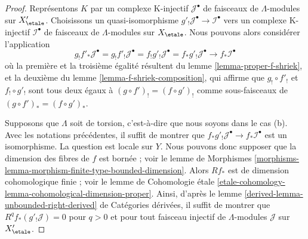 \begin{proof}
Représentons $K$ par un complexe K-injectif $\mathcal{J}^\bullet$ de
faisceaux de $\Lambda$-modules sur $X'_\etale$. Choisissons un quasi-isomorphisme
$g'_!\mathcal{J}^\bullet \to \mathcal{I}^\bullet$ vers un
complexe K-injectif $\mathcal{I}^\bullet$ de
faisceaux de $\Lambda$-modules sur $X_\etale$.
Nous pouvons alors considérer l'application
$$
g_!f'_*\mathcal{J}^\bullet =
g_!f'_!\mathcal{J}^\bullet =
f_!g'_!\mathcal{J}^\bullet =
f_*g'_!\mathcal{J}^\bullet \to
f_*\mathcal{I}^\bullet
$$
où la première et la troisième égalité résultent du
lemme \ref{lemma-proper-f-shriek},
et la deuxième du
lemme \ref{lemma-f-shriek-composition}, qui affirme que
$g_! \circ f'_!$ et $f_! \circ g'_!$ sont tous deux égaux à
$(g \circ f')_! = (f \circ g')_!$ comme sous-faisceaux de
$(g \circ f')_* = (f \circ g')_*$.

\medskip\noindent
Supposons que $\Lambda$ soit de torsion, c'est-à-dire que nous soyons dans le cas (b).
Avec les notations précédentes, il suffit de montrer que
$f_*g'_!\mathcal{J}^\bullet \to f_*\mathcal{I}^\bullet$
est un isomorphisme. La question est locale sur $Y$.
Nous pouvons donc supposer que la dimension
des fibres de $f$ est bornée ; voir le lemme de Morphismes
\ref{morphisms-lemma-morphism-finite-type-bounded-dimension}.
Alors $Rf_*$ est de dimension cohomologique finie ; voir le
lemme de Cohomologie étale
\ref{etale-cohomology-lemma-cohomological-dimension-proper}.
Ainsi, d'après le lemme \ref{derived-lemma-unbounded-right-derived} de Catégories dérivées,
il suffit de montrer que $R^qf_*(g'_!\mathcal{J}) = 0$ pour $q > 0$
et pour tout faisceau injectif de $\Lambda$-modules $\mathcal{J}$
sur $X'_\etale$.


\end{proof}
